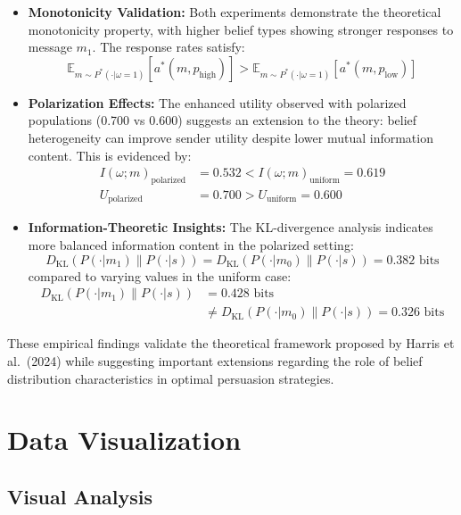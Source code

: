 \documentclass[12pt]{article}
\theoremstyle{plain}
\theoremstyle{definition}
\theoremstyle{remark}
\begin{document}
\begin{itemize}
    \item \textbf{Monotonicity Validation:} Both experiments demonstrate the theoretical monotonicity property, with higher belief types showing stronger responses to message $m_1$. The response rates satisfy:
    \[\mathbb{E}_{m\sim P^*(\cdot|\omega=1)} [a^*(m,p_{\text{high}})] > \mathbb{E}_{m\sim P^*(\cdot|\omega=1)} [a^*(m,p_{\text{low}})]\]

    \item \textbf{Polarization Effects:} The enhanced utility observed with polarized populations (0.700 vs 0.600) suggests an extension to the theory: belief heterogeneity can improve sender utility despite lower mutual information content. This is evidenced by:
    \begin{align*}
        I(\omega;m)_{\text{polarized}} &= 0.532 < I(\omega;m)_{\text{uniform}} = 0.619 \\
        U_{\text{polarized}} &= 0.700 > U_{\text{uniform}} = 0.600
    \end{align*}

    \item \textbf{Information-Theoretic Insights:} The KL-divergence analysis indicates more balanced information content in the polarized setting:
    \[D_{\text{KL}}(P(\cdot|m_1)\|P(\cdot|s)) = D_{\text{KL}}(P(\cdot|m_0)\|P(\cdot|s)) = 0.382 \text{ bits}\]
    compared to varying values in the uniform case:
    \begin{align*}
        D_{\text{KL}}(P(\cdot|m_1)\|P(\cdot|s)) &= 0.428 \text{ bits} \\
        &\neq D_{\text{KL}}(P(\cdot|m_0)\|P(\cdot|s)) = 0.326 \text{ bits}
    \end{align*}
\end{itemize}

These empirical findings validate the theoretical framework proposed by Harris et al.\ (2024) while suggesting important extensions regarding the role of belief distribution characteristics in optimal persuasion strategies.

\pagebreak
\section{Data Visualization}

\subsection{Visual Analysis}
\end{document}
